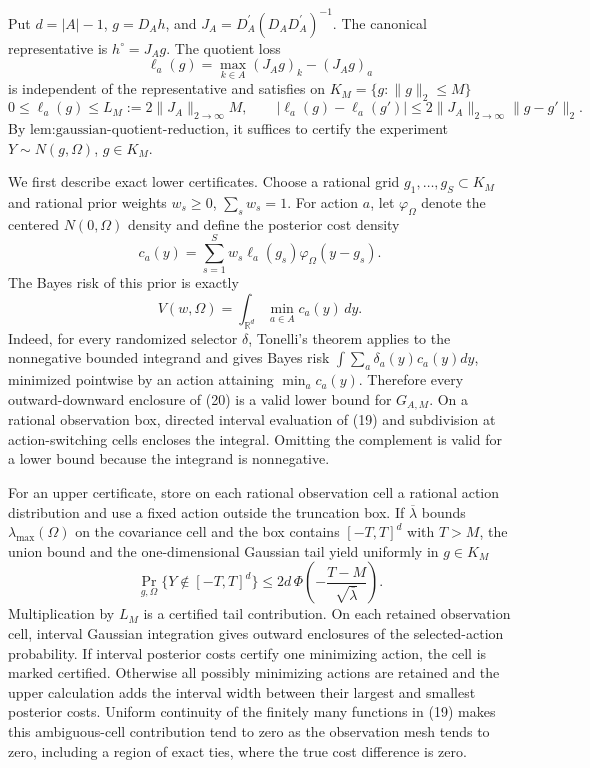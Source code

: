 Put \(d=|A|-1\), \(g=D_Ah\), and \(J_A=D_A^{\prime}(D_AD_A^{\prime})^{-1}\).  The canonical representative is \(h^\circ=J_Ag\).  The quotient loss
\[
\ell_a(g)=\max_{k\in A}(J_Ag)_k-(J_Ag)_a
\]
is independent of the representative and satisfies on \(K_M=\{g:\lVert g\rVert_2\leq M\}\)
\[
0\leq\ell_a(g)\leq L_M:=2\lVert J_A\rVert_{2\to\infty}M,
\qquad
|\ell_a(g)-\ell_a(g')|\leq2\lVert J_A\rVert_{2\to\infty}\lVert g-g'\rVert_2. \tag{18}
\]
By \(\text{lem:gaussian-quotient-reduction}\), it suffices to certify the experiment \(Y\sim N(g,\Omega)\), \(g\in K_M\).

We first describe exact lower certificates.  Choose a rational grid \(g_1,\ldots,g_S\subset K_M\) and rational prior weights \(w_s\geq0\), \(\sum_sw_s=1\).  For action \(a\), let \(\varphi_\Omega\) denote the centered \(N(0,\Omega)\) density and define the posterior cost density
\[
c_a(y)=\sum_{s=1}^S w_s\ell_a(g_s)\varphi_\Omega(y-g_s). \tag{19}
\]
The Bayes risk of this prior is exactly
\[
V(w,\Omega)=\int_{\mathbb R^d}\min_{a\in A}c_a(y)\,dy. \tag{20}
\]
Indeed, for every randomized selector \(\delta\), Tonelli's theorem applies to the nonnegative bounded integrand and gives Bayes risk \(\int\sum_a\delta_a(y)c_a(y)dy\), minimized pointwise by an action attaining \(\min_ac_a(y)\).  Therefore every outward-downward enclosure of (20) is a valid lower bound for \(G_{A,M}\).  On a rational observation box, directed interval evaluation of (19) and subdivision at action-switching cells encloses the integral.  Omitting the complement is valid for a lower bound because the integrand is nonnegative.

For an upper certificate, store on each rational observation cell a rational action distribution and use a fixed action outside the truncation box.  If \(\overline\lambda\) bounds \(\lambda_{\max}(\Omega)\) on the covariance cell and the box contains \([-T,T]^d\) with \(T>M\), the union bound and the one-dimensional Gaussian tail yield uniformly in \(g\in K_M\)
\[
\Pr_{g,\Omega}\{Y\notin[-T,T]^d\}
\leq2d\,\Phi\!\left(-\frac{T-M}{\sqrt{\overline\lambda}}\right). \tag{21}
\]
Multiplication by \(L_M\) is a certified tail contribution.  On each retained observation cell, interval Gaussian integration gives outward enclosures of the selected-action probability.  If interval posterior costs certify one minimizing action, the cell is marked certified.  Otherwise all possibly minimizing actions are retained and the upper calculation adds the interval width between their largest and smallest posterior costs.  Uniform continuity of the finitely many functions in (19) makes this ambiguous-cell contribution tend to zero as the observation mesh tends to zero, including a region of exact ties, where the true cost difference is zero.

